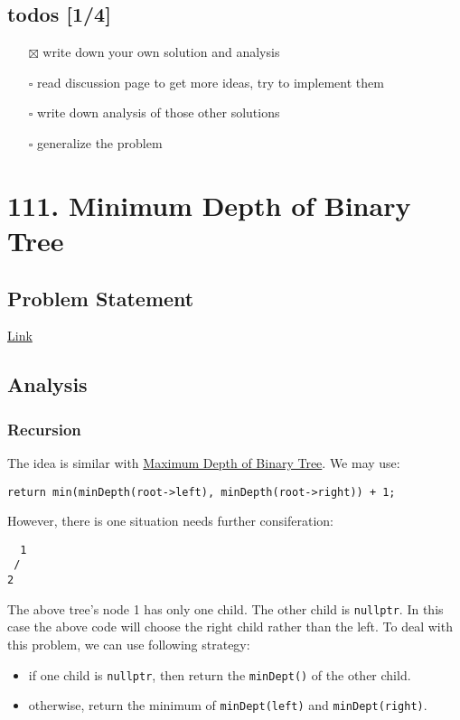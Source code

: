 \documentclass[12pt]{article}
\begin{document}
\subsection{todos [1/4]}
\label{sec:orgff41ac7}
\begin{itemize}
\item[{$\boxtimes$}] write down your own solution and analysis
\item[{$\square$}] read discussion page to get more ideas, try to implement them
\item[{$\square$}] write down analysis of those other solutions
\item[{$\square$}] generalize the problem
\end{itemize}
\section{111. Minimum Depth of Binary Tree}
\label{sec:orga26a5ac}
\subsection{Problem Statement}
\label{sec:org8e4a14a}
\href{https://leetcode.com/problems/minimum-depth-of-binary-tree/}{Link}
\subsection{Analysis}
\label{sec:org4fb6d45}
\subsubsection{Recursion}
\label{sec:orga768744}
The idea is similar with \hyperref[org1f526b2]{Maximum Depth of Binary Tree}. We may use:
\begin{verbatim}
return min(minDepth(root->left), minDepth(root->right)) + 1;
\end{verbatim}

However, there is one situation needs further consiferation:
\begin{verbatim}
  1
 /
2 
\end{verbatim}
The above tree's node 1 has only one child. The other child is \texttt{nullptr}. In this case the above code will choose the right child rather than the left. To deal with this problem, we can use following strategy:
\begin{itemize}
\item if one child is \texttt{nullptr}, then return the \texttt{minDept()} of the other child.
\item otherwise, return the minimum of \texttt{minDept(left)} and \texttt{minDept(right)}.
\end{itemize}
\end{document}
